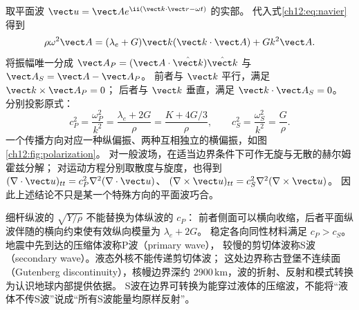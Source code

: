 取平面波 $\vect u=\vect A e^{\ii(\vect k\cdot\vect r-\omega t)}$ 的实部。
代入式\eqref{ch12:eq:navier}得到
\[
 \rho\omega^2\vect A=(\lambda_e+G)\vect k(\vect k\cdot\vect A)+Gk^2\vect A.
\]
将振幅唯一分成
$\vect A_P=(\vect A\cdot\hat{\vect k})\hat{\vect k}$ 与
$\vect A_S=\vect A-\vect A_P$。
前者与 $\vect k$ 平行，满足 $\vect k\times\vect A_P=0$；
后者与 $\vect k$ 垂直，满足 $\vect k\cdot\vect A_S=0$。
分别投影原式：
\begin{equation}
 c_P^2=\frac{\omega_P^2}{k^2}=\frac{\lambda_e+2G}{\rho}
      =\frac{K+4G/3}{\rho},\qquad
 c_S^2=\frac{\omega_S^2}{k^2}=\frac G\rho.
 \label{ch12:eq:body-speeds}
\end{equation}
一个传播方向对应一种纵偏振、两种互相独立的横偏振，如图\ref{ch12:fig:polarization}。
对一般波场，在适当边界条件下可作无旋与无散的赫尔姆霍兹分解；
对运动方程分别取散度与旋度，也得到
$(\nabla\cdot\vect u)_{tt}=c_P^2\nabla^2(\nabla\cdot\vect u)$、
$(\nabla\times\vect u)_{tt}=c_S^2\nabla^2(\nabla\times\vect u)$。
因此上述结论不只是某一个特殊方向的平面波巧合。

\begin{center}
\label{ch12:fig:polarization}
\end{center}

细杆纵波的 $\sqrt{Y/\rho}$ 不能替换为体纵波的 $c_P$：
前者侧面可以横向收缩，后者平面纵波伴随的横向约束使有效纵向模量为 $\lambda_e+2G$。
稳定各向同性材料满足 $c_P>c_S$。地震中先到达的压缩体波称P波（primary wave），
较慢的剪切体波称S波（secondary wave）。液态外核不能传递剪切体波；
这处边界称古登堡不连续面（Gutenberg discontinuity），核幔边界深约 $2900\,\mathrm{km}$，波的折射、反射和模式转换为认识地球内部提供依据。
S波在边界可转换为能穿过液体的压缩波，不能将“液体不传S波”说成“所有S波能量均原样反射”。

